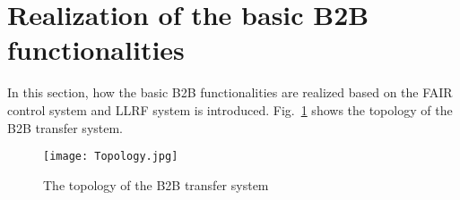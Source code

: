  
\section{Realization of the basic B2B functionalities}
In this section, how the basic B2B functionalities are realized based on the FAIR control system and LLRF system is introduced.
Fig.~\ref{Topology} shows the topology of the B2B transfer system.
\begin{figure}[!htb]
   \centering   
   \texttt{[image: Topology.jpg]}
   \caption{The topology of the B2B transfer system}
   \label{Topology}
\end{figure}
